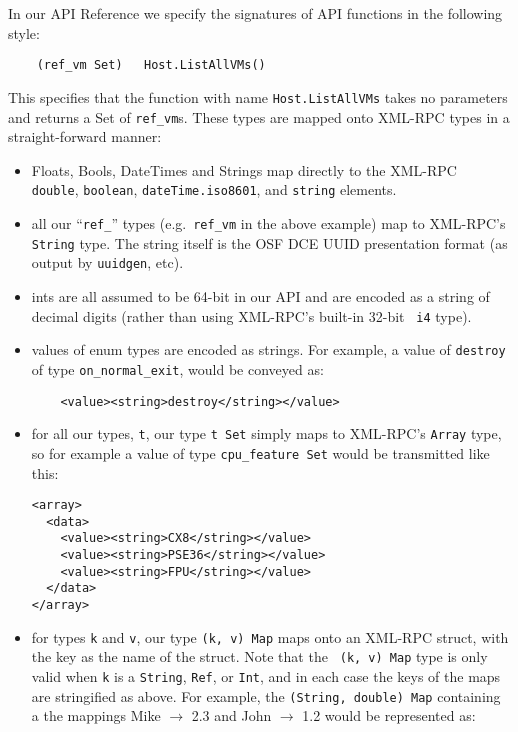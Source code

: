 In our API Reference we specify the signatures of API functions in the following
style:
\begin{verbatim}
    (ref_vm Set)   Host.ListAllVMs()
\end{verbatim}
This specifies that the function with name {\tt Host.ListAllVMs} takes
no parameters and returns a Set of {\tt ref\_vm}s.
These types are mapped onto XML-RPC types in a straight-forward manner:
\begin{itemize}
  \item Floats, Bools, DateTimes and Strings map directly to the XML-RPC {\tt
  double}, {\tt boolean}, {\tt dateTime.iso8601}, and {\tt string} elements.

  \item all our ``{\tt ref\_}'' types (e.g.\ {\tt ref\_vm} in the above
  example) map to XML-RPC's {\tt String} type.  The string itself is the OSF
  DCE UUID presentation format (as output by {\tt uuidgen}, etc).

  \item ints are all assumed to be 64-bit in our API and are encoded as a
  string of decimal digits (rather than using XML-RPC's built-in 32-bit {\tt
  i4} type).

  \item values of enum types are encoded as strings. For example, a value of
  {\tt destroy} of type {\tt on\_normal\_exit}, would be conveyed as:
  \begin{verbatim}
    <value><string>destroy</string></value>
  \end{verbatim}

  \item for all our types, {\tt t}, our type {\tt t Set} simply maps to
  XML-RPC's {\tt Array} type, so for example a value of type {\tt cpu\_feature
  Set} would be transmitted like this:

  \begin{verbatim}
<array>
  <data>
    <value><string>CX8</string></value>
    <value><string>PSE36</string></value>
    <value><string>FPU</string></value>
  </data>
</array> 
  \end{verbatim}

  \item for types {\tt k} and {\tt v}, our type {\tt (k, v) Map} maps onto an
  XML-RPC struct, with the key as the name of the struct.  Note that the {\tt
  (k, v) Map} type is only valid when {\tt k} is a {\tt String}, {\tt Ref}, or
  {\tt Int}, and in each case the keys of the maps are stringified as
  above. For example, the {\tt (String, double) Map} containing a the mappings
  Mike $\rightarrow$ 2.3 and John $\rightarrow$ 1.2 would be represented as:


\end{itemize}
